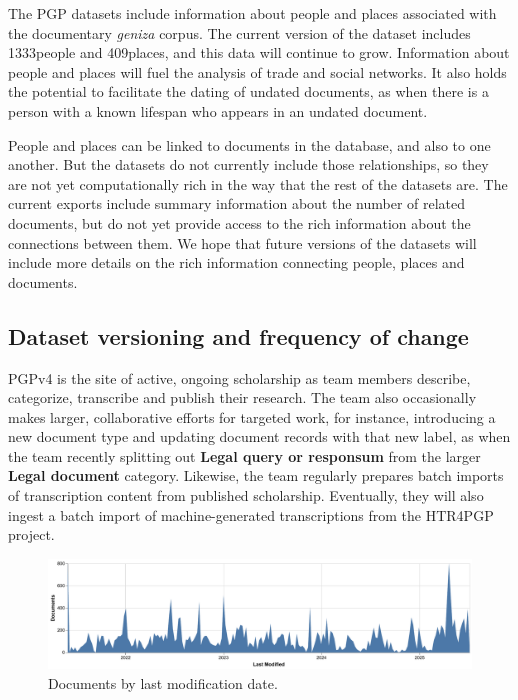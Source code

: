 \documentclass{article}
\def\totalPeopleRecords{1333}
\def\totalPlaceRecords{409}
\begin{document}
The PGP datasets include information about people and places associated with the documentary \textit{geniza }corpus. The current version of the dataset includes \totalPeopleRecords\space people and \totalPlaceRecords\space places, and this data will continue to grow. Information about people and places will fuel the analysis of trade and social networks. It also holds the potential to facilitate the dating of undated documents, as when there is a person with a known lifespan who appears in an undated document. 

People and places can be linked to documents in the database, and also to one another. But the datasets do not currently include those relationships, so they are not yet computationally rich in the way that the rest of the datasets are. The current exports include summary information about the number of related documents, but do not yet provide access to the rich information about the connections between them. We hope that future versions of the datasets will include more details on the rich information connecting people, places and documents.

\subsection{Dataset versioning and frequency of change}

PGPv4 is the site of active, ongoing scholarship as team members describe, categorize, transcribe and publish  their research. The team also occasionally makes larger, collaborative efforts for targeted work, for instance, introducing a new document type and updating document records with that new label, as when the team recently splitting out \textbf{Legal query or responsum} from the larger \textbf{Legal document} category. Likewise, the team regularly prepares batch imports of transcription content from published scholarship. Eventually, they will also ingest a batch import of machine-generated transcriptions from the HTR4PGP project.

\begin{figure}[!hbt]
  \includegraphics[width=\textwidth]{charts/docs_last_modified.pdf}
  \centering
  \caption{Documents by last modification date.}
  \label{fig:docs-last-modified}
\end{figure}
\end{document}
